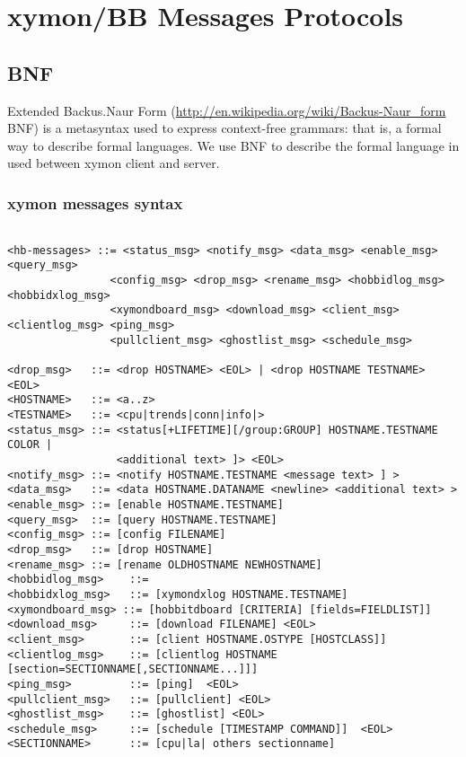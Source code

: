 %

\chapter{xymon/BB Messages Protocols}

%
\section{BNF}

Extended Backus.Naur Form (\url{http://en.wikipedia.org/wiki/Backus-Naur_form} BNF) is a metasyntax used to express context-free grammars: that is, a formal way to describe formal languages. We use BNF to describe the formal language in used between xymon client and server.

\subsection{xymon messages syntax}

\begin{verbatim}

<hb-messages> ::= <status_msg> <notify_msg> <data_msg> <enable_msg> <query_msg> 
                <config_msg> <drop_msg> <rename_msg> <hobbidlog_msg> <hobbidxlog_msg> 
                <xymondboard_msg> <download_msg> <client_msg> <clientlog_msg> <ping_msg> 
                <pullclient_msg> <ghostlist_msg> <schedule_msg>

<drop_msg>   ::= <drop HOSTNAME> <EOL> | <drop HOSTNAME TESTNAME> <EOL>
<HOSTNAME>   ::= <a..z> 
<TESTNAME>   ::= <cpu|trends|conn|info|> 
<status_msg> ::= <status[+LIFETIME][/group:GROUP] HOSTNAME.TESTNAME COLOR |
                 <additional text> ]> <EOL>
<notify_msg> ::= <notify HOSTNAME.TESTNAME <message text> ] >
<data_msg>   ::= <data HOSTNAME.DATANAME <newline> <additional text> >
<enable_msg> ::= [enable HOSTNAME.TESTNAME]
<query_msg>  ::= [query HOSTNAME.TESTNAME]
<config_msg> ::= [config FILENAME]
<drop_msg>   ::= [drop HOSTNAME]
<rename_msg> ::= [rename OLDHOSTNAME NEWHOSTNAME]
<hobbidlog_msg>    ::= 
<hobbidxlog_msg>   ::= [xymondxlog HOSTNAME.TESTNAME]
<xymondboard_msg> ::= [hobbitdboard [CRITERIA] [fields=FIELDLIST]]
<download_msg>     ::= [download FILENAME] <EOL>
<client_msg>       ::= [client HOSTNAME.OSTYPE [HOSTCLASS]]
<clientlog_msg>    ::= [clientlog HOSTNAME [section=SECTIONNAME[,SECTIONNAME...]]]
<ping_msg>         ::= [ping]  <EOL>
<pullclient_msg>   ::= [pullclient] <EOL>
<ghostlist_msg>    ::= [ghostlist] <EOL>
<schedule_msg>     ::= [schedule [TIMESTAMP COMMAND]]  <EOL>
<SECTIONNAME>      ::= [cpu|la| others sectionname]

\end{verbatim}



